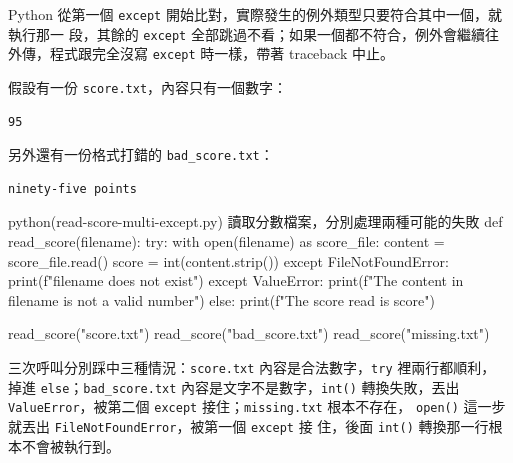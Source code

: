 Python 從第一個 \texttt{except} 開始比對，實際發生的例外類型只要符合其中一個，就執行那一
段，其餘的 \texttt{except} 全部跳過不看；如果一個都不符合，例外會繼續往外傳，程式跟完全沒寫
\texttt{except} 時一樣，帶著 traceback 中止。

假設有一份 \texttt{score.txt}，內容只有一個數字：

\begin{verbatim}
95
\end{verbatim}

另外還有一份格式打錯的 \texttt{bad\_score.txt}：

\begin{verbatim}
ninety-five points
\end{verbatim}

\begin{example}{python}{(read-score-multi-except.py) 讀取分數檔案，分別處理兩種可能的失敗}
def read_score(filename):
    try:
        with open(filename) as score_file:
            content = score_file.read()
        score = int(content.strip())
    except FileNotFoundError:
        print(f"{filename} does not exist")
    except ValueError:
        print(f"The content in {filename} is not a valid number")
    else:
        print(f"The score read is {score}")

read_score("score.txt")
read_score("bad_score.txt")
read_score("missing.txt")
\end{example}


三次呼叫分別踩中三種情況：\texttt{score.txt} 內容是合法數字，\texttt{try} 裡兩行都順利，
掉進 \texttt{else}；\texttt{bad\_score.txt} 內容是文字不是數字，\texttt{int()} 轉換失敗，丟出
\texttt{ValueError}，被第二個 \texttt{except} 接住；\texttt{missing.txt} 根本不存在，
\texttt{open()} 這一步就丟出 \texttt{FileNotFoundError}，被第一個 \texttt{except} 接
住，後面 \texttt{int()} 轉換那一行根本不會被執行到。


